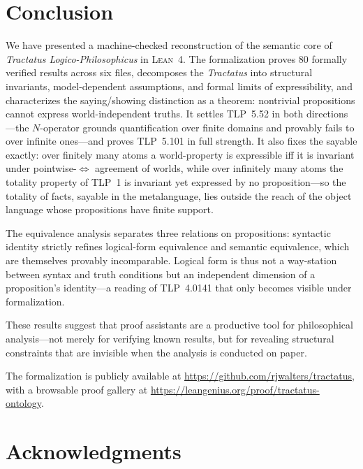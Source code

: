 \documentclass[jsl,bibother]{asl}
\theoremstyle{definition}
\theoremstyle{remark}
\newcommand{\Lean}{\textsc{Lean}}
\begin{document}
\section{Conclusion}
\label{sec:conclusion}

We have presented a machine-checked reconstruction of the
semantic core of \emph{Tractatus Logico-Philosophicus} in
\Lean~4.  The formalization proves 80 formally verified results
across six files, decomposes the
\emph{Tractatus} into structural invariants, model-dependent
assumptions, and formal limits of expressibility, and
characterizes the saying/showing distinction as a theorem:
nontrivial propositions cannot express world-independent truths.
It settles TLP~5.52 in both directions---the $N$-operator grounds
quantification over finite domains and provably fails to over
infinite ones---and proves TLP~5.101 in full strength.
It also fixes the sayable exactly: over finitely many atoms a
world-property is expressible iff it is invariant under
pointwise-$\iff$ agreement of worlds, while over infinitely many
atoms the totality property of TLP~1 is invariant yet expressed by
no proposition---so the totality of facts, sayable in the
metalanguage, lies outside the reach of the object language whose
propositions have finite support.

The equivalence analysis separates three relations on
propositions: syntactic identity strictly refines logical-form
equivalence and semantic equivalence, which are themselves
provably incomparable.  Logical form is thus not a way-station
between syntax and truth conditions but an independent dimension
of a proposition's identity---a reading of TLP~4.0141 that only
becomes visible under formalization.

These results suggest that proof assistants are a productive tool
for philosophical analysis---not merely for verifying known
results, but for revealing structural constraints that are
invisible when the analysis is conducted on paper.

The formalization is publicly available at
\url{https://github.com/rjwalters/tractatus}, with a
browsable proof gallery at
\url{https://leangenius.org/proof/tractatus-ontology}.

\section*{Acknowledgments}
\end{document}
